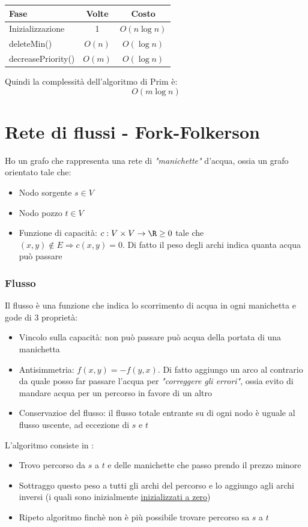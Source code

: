 \begin{center}
	\begin{tabular}{lcc}
		\toprule
		Fase                           & Volte  & Costo         \\
		\midrule
		Inizializzazione               & 1      & $O(n \log n)$ \\
		{\ttfamily deleteMin()}        & $O(n)$ & $O(\log n)$   \\
		{\ttfamily decreasePriority()} & $O(m)$ & $O(\log n)$   \\
		\bottomrule
	\end{tabular}
\end{center}

Quindi la complessità dell'algoritmo di Prim è:
\[
	O\left(m \log n\right)
\]


\section{Rete di flussi - Fork-Folkerson}
Ho un grafo che rappresenta una rete di \textit{"manichette"} d'acqua, ossia un grafo orientato tale che:
\begin{itemize}
	\item Nodo sorgente $ s \in  V $
	\item Nodo pozzo $ t \in V $
	\item Funzione di capacità: $ c : V \times  V \rightarrow \R \ge 0 $ tale che $ \left(x,y\right) \not \in  E \Rightarrow c\left(x, y\right) = 0 $. Di fatto il peso degli archi indica quanta acqua può passare
\end{itemize}
\subsubsection{Flusso}
Il flusso è una funzione che indica lo scorrimento di acqua in ogni manichetta e gode di 3 proprietà:
\begin{itemize}
	\item Vincolo sulla capacità: non può passare può acqua della portata di una manichetta
	\item Antisimmetria: $ f\left(x,y\right) = -f\left(y,x\right) $. Di fatto aggiungo un arco al contrario da quale posso far passare l'acqua per \textit{"correggere gli errori"}, ossia evito di mandare acqua per un percorso in favore di un altro
	\item Conservazioe del flusso: il flusso totale entrante su di ogni nodo è uguale al flusso uscente, ad eccezione di $ s  $ e $ t $\label{conservazione del flusso}

\end{itemize}
L'algoritmo consiste in :
\begin{itemize}
	\item Trovo percorso da $ s $ a $ t $ e delle manichette che passo prendo il prezzo minore
	\item Sottraggo questo peso a tutti gli archi del percorso e lo aggiungo agli archi inversi (i quali sono inizialmente \underline{inizializzati a zero})
	\item Ripeto algoritmo finchè non è più possibile trovare percorso sa $ s  $ a  $ t $
\end{itemize}

